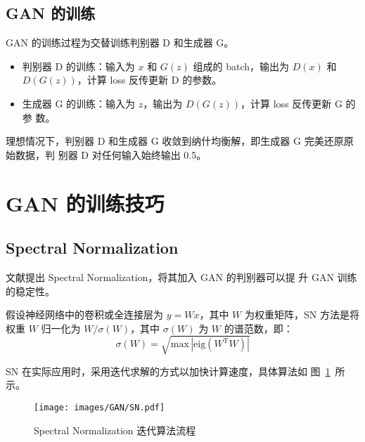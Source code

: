 \subsection{GAN 的训练}

GAN 的训练过程为交替训练判别器 D 和生成器 G。

\begin{itemize}
  \item 判别器 D 的训练：输入为 $x$ 和 $G(z)$ 组成的 batch，输出为 $D(x)$ 和
    $D(G(z))$，计算 loss 反传更新 D 的参数。
  \item 生成器 G 的训练：输入为 $z$，输出为 $D(G(z))$，计算 loss 反传更新 G 的参
    数。
\end{itemize}

理想情况下，判别器 D 和生成器 G 收敛到纳什均衡解，即生成器 G 完美还原原始数据，判
别器 D 对任何输入始终输出 0.5。

\section{GAN 的训练技巧}
\subsection{Spectral Normalization}
文献提出 Spectral Normalization，将其加入 GAN 的判别器可以提
升 GAN 训练的稳定性。

假设神经网络中的卷积或全连接层为 $y = Wx$，其中 $W$ 为权重矩阵，SN 方法是将权重
$W$ 归一化为 $W/\sigma(W)$，其中 $\sigma(W)$ 为 $W$ 的谱范数，即：
\begin{equation}
  \sigma(W) = \sqrt{\mathrm{max} \, \left | \mathrm{eig} (W^{\mathrm{T}} W) \right |}
\end{equation}

SN 在实际应用时，采用迭代求解的方式以加快计算速度，具体算法如
图~\ref{fig:sn-algo}~所示。

\begin{figure}[ht]
  \centering
  \texttt{[image: images/GAN/SN.pdf]}
  \caption{Spectral Normalization 迭代算法流程}
  \label{fig:sn-algo}
\end{figure}

